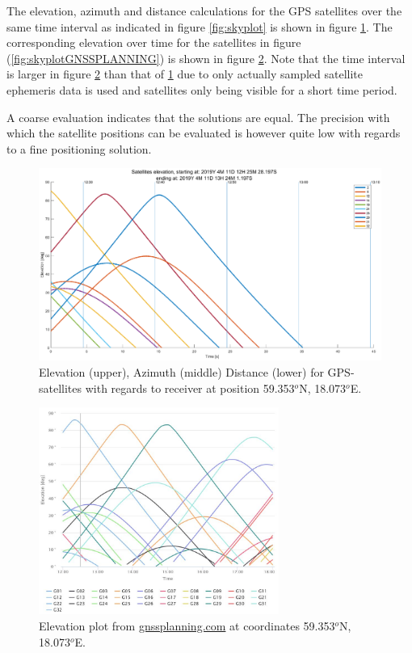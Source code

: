 The elevation, azimuth and distance calculations for the GPS satellites over the same time interval as indicated in figure \ref{fig:skyplot} is shown in figure \ref{fig:el6H}. The corresponding elevation over time for the satellites in figure (\ref{fig:skyplotGNSSPLANNING}) is shown in figure \ref{fig:elGNSSPlanning}. Note that the time interval is larger in figure \ref{fig:elGNSSPlanning} than that of \ref{fig:el6H} due to only actually sampled satellite ephemeris data is used and satellites only being visible for a short time period. 
\par 
A coarse evaluation indicates that the solutions are equal. The precision with which the satellite positions can be evaluated is however quite low with regards to a fine positioning solution.
\begin{figure}[!h]
\includegraphics[width=\textwidth]{Results/elev6H.eps}
\caption{\label{fig:el6H} Elevation (upper), Azimuth (middle) Distance (lower) for GPS-satellites with regards to receiver at position 59.353$^o$N, 18.073$^o$E.}
\end{figure}
\begin{figure}
\centering
\includegraphics[width=0.7\textwidth]{Results/elevGNSSPlanning.jpg}
\caption{\label{fig:elGNSSPlanning} Elevation plot from \url{gnssplanning.com} at coordinates 59.353$^o$N, 18.073$^o$E. }
\end{figure}

